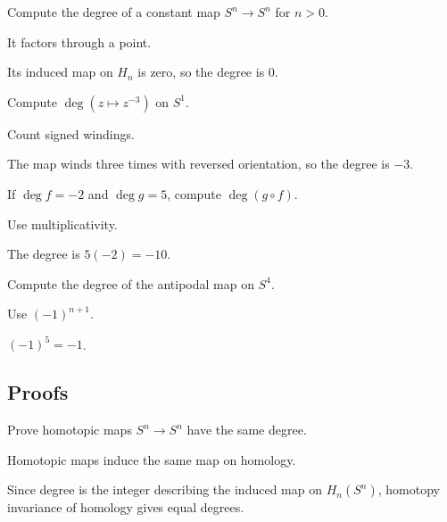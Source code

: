 \begin{exercise}\label{exr:viii03-ped-02}
Compute the degree of a constant map $S^n\to S^n$ for $n>0$.
\end{exercise}
\begin{hint}
It factors through a point.
\end{hint}
\begin{solution}
Its induced map on $H_n$ is zero, so the degree is $0$.
\end{solution}

\begin{exercise}\label{exr:viii03-ped-03}
Compute $\deg(z\mapsto z^{-3})$ on $S^1$.
\end{exercise}
\begin{hint}
Count signed windings.
\end{hint}
\begin{solution}
The map winds three times with reversed orientation, so the degree is $-3$.
\end{solution}

\begin{exercise}[Composite]\label{exr:viii03-ped-04}
If $\deg f=-2$ and $\deg g=5$, compute $\deg(g\circ f)$.
\end{exercise}
\begin{hint}
Use multiplicativity.
\end{hint}
\begin{solution}
The degree is $5(-2)=-10$.
\end{solution}

\begin{exercise}\label{exr:viii03-ped-05}
Compute the degree of the antipodal map on $S^4$.
\end{exercise}
\begin{hint}
Use $(-1)^{n+1}$.
\end{hint}
\begin{solution}
$(-1)^5=-1$.
\end{solution}

\subsection*{Proofs}

\begin{exercise}\label{exr:viii03-ped-06}
Prove homotopic maps $S^n\to S^n$ have the same degree.
\end{exercise}
\begin{hint}
Homotopic maps induce the same map on homology.
\end{hint}
\begin{solution}
Since degree is the integer describing the induced map on $H_n(S^n)$, homotopy invariance of homology gives equal degrees.
\end{solution}

